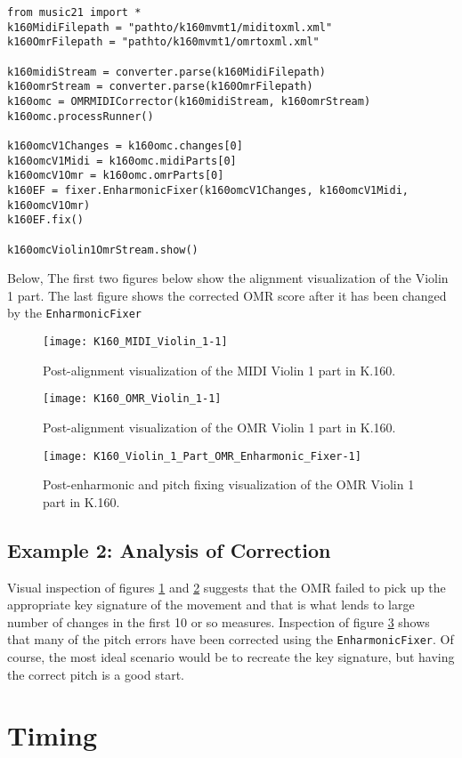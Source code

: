 \begin{verbatim}
from music21 import *
k160MidiFilepath = "pathto/k160mvmt1/miditoxml.xml"
k160OmrFilepath = "pathto/k160mvmt1/omrtoxml.xml"
         
k160midiStream = converter.parse(k160MidiFilepath)
k160omrStream = converter.parse(k160OmrFilepath)
k160omc = OMRMIDICorrector(k160midiStream, k160omrStream)
k160omc.processRunner()
        
k160omcV1Changes = k160omc.changes[0]
k160omcV1Midi = k160omc.midiParts[0]
k160omcV1Omr = k160omc.omrParts[0]
k160EF = fixer.EnharmonicFixer(k160omcV1Changes, k160omcV1Midi, k160omcV1Omr)
k160EF.fix()

k160omcViolin1OmrStream.show()
\end{verbatim}

Below, The first two figures below show the alignment visualization of the Violin 1 part. The last figure shows the corrected OMR score after it has been changed by the \texttt{EnharmonicFixer}

\begin{figure}[H]
\centering
\texttt{[image: K160\_MIDI\_Violin\_1-1]}
\caption{Post-alignment visualization of the MIDI Violin 1 part in K.160.}
\label{fig:k160postalignv1midi}
\end{figure}

\begin{figure}[H]
\centering
\texttt{[image: K160\_OMR\_Violin\_1-1]}
\caption{Post-alignment visualization of the OMR Violin 1 part in K.160.}
\label{fig:k160postalignv1omr}
\end{figure}

\begin{figure}[H]
\centering
\texttt{[image: K160\_Violin\_1\_Part\_OMR\_Enharmonic\_Fixer-1]}
\caption{Post-enharmonic and pitch fixing visualization of the OMR Violin 1 part in K.160.}
\label{fig:k160postfixv1}
\end{figure}

\subsection{Example 2: Analysis of Correction}
Visual inspection of figures \ref{fig:k160postalignv1midi} and \ref{fig:k160postalignv1omr} suggests that the OMR failed to pick up the appropriate key signature of the movement and that is what lends to large number of changes in the first 10 or so measures. Inspection of figure \ref{fig:k160postfixv1} shows that many of the pitch errors have been corrected using the \texttt{EnharmonicFixer}. Of course, the most ideal scenario would be to recreate the key signature, but having the correct pitch is a good start. 

\section{Timing} \label{timing}

